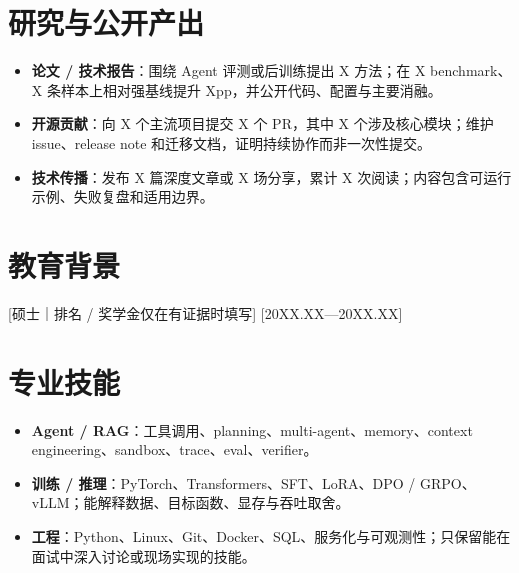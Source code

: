 \documentclass{resume-photo}
\begin{document}
\section{研究与公开产出}
\begin{itemize}
  \item \textbf{论文 / 技术报告}：围绕 Agent 评测或后训练提出 X 方法；在 X benchmark、X 条样本上相对强基线提升 Xpp，并公开代码、配置与主要消融。
  \item \textbf{开源贡献}：向 X 个主流项目提交 X 个 PR，其中 X 个涉及核心模块；维护 issue、release note 和迁移文档，证明持续协作而非一次性提交。
  \item \textbf{技术传播}：发布 X 篇深度文章或 X 场分享，累计 X 次阅读；内容包含可运行示例、失败复盘和适用边界。
\end{itemize}

\section{教育背景}
[\textnormal{硕士｜排名 / 奖学金仅在有证据时填写}]
[20XX.XX—20XX.XX]

\section{专业技能}
\begin{itemize}
  \item \textbf{Agent / RAG}：工具调用、planning、multi-agent、memory、context engineering、sandbox、trace、eval、verifier。
  \item \textbf{训练 / 推理}：PyTorch、Transformers、SFT、LoRA、DPO / GRPO、vLLM；能解释数据、目标函数、显存与吞吐取舍。
  \item \textbf{工程}：Python、Linux、Git、Docker、SQL、服务化与可观测性；只保留能在面试中深入讨论或现场实现的技能。
\end{itemize}
\end{document}
